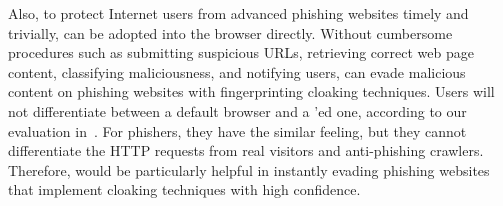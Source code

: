 Also, to protect Internet users from advanced phishing websites timely and trivially, \spartacus can be adopted into the browser directly.
Without cumbersome procedures such as submitting suspicious URLs, retrieving correct web page content, classifying maliciousness, and notifying users,
\spartacus can evade malicious content on phishing websites with fingerprinting cloaking techniques.
Users will not differentiate between a default browser and a \spartacus'ed one, according to our evaluation in~.
For phishers, they have the similar feeling, but they cannot differentiate the HTTP requests from real visitors and anti-phishing crawlers.
Therefore, \spartacus would be particularly helpful in instantly evading phishing websites that implement cloaking techniques with high confidence.